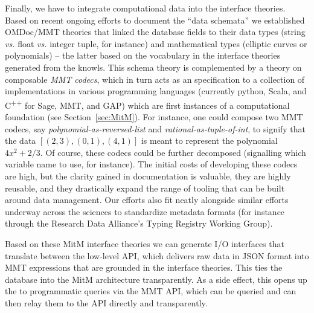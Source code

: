 Finally, we have to integrate computational data into the interface theories. Based on
recent ongoing efforts \cite{lmfdb-formats} to document the \LMFDB ``data schemata'' we
established OMDoc/MMT theories that linked the database fields to their data types (string
\emph{vs.} float \emph{vs.} integer tuple, for instance) and mathematical types (elliptic
curves or polynomials) -- the latter based on the vocabulary in the interface theories
generated from the \LMFDB knowls. This schema theory is complemented by a theory on
composable \emph{MMT codecs}, which in turn acts as an specification to a collection of
implementations in various programming languages (currently python, Scala, and
C\textsuperscript{++} for Sage, MMT, and GAP) which are first instances of a computational
foundation (see Section~\ref{sec:MitM}).  For instance, one could compose two MMT codecs,
say \emph{polynomial-as-reversed-list} and \emph{rational-as-tuple-of-int}, to signify
that the data $[(2,3),(0,1),(4,1)]$ is meant to represent the polynomial $4x^2+2/3$. Of
course, these codecs could be further decomposed (signalling which variable name to use,
for instance). The initial costs of developing these codecs are high, but the clarity
gained in documentation is valuable, they are highly reusable, and they drastically expand
the range of tooling that can be built around data management. Our efforts also fit neatly
alongside similar efforts underway across the sciences to standardize metadata formats
(for instance through the Research Data Alliance's Typing Registry Working
Group\cite{rda-typing}).

Based on these MitM interface theories we can generate I/O interfaces that translate
between the low-level \LMFDB API, which delivers raw \Mongo data in JSON format into MMT
expressions that are grounded in the interface theories. This ties the \LMFDB database
into the MitM architecture transparently. As a side effect, this opens up the \LMFDB to
programmatic queries via the MMT API, which can be queried and can then relay them to the
\LMFDB API directly and transparently.


